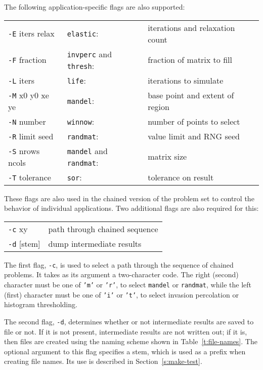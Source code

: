 The following application-specific flags are also supported:
\begin{small}\begin{center}\begin{tabular}{lll}
{\tt{-E}} iters relax	& {\tt{elastic}}:			& iterations and relaxation count\\
{\tt{-F}} fraction	& {\tt{invperc}} and {\tt{thresh}}:	& fraction of matrix to fill\\
{\tt{-L}} iters		& {\tt{life}}:				& iterations to simulate\\
{\tt{-M}} x0 y0 xe ye	& {\tt{mandel}}:			& base point and extent of region\\
{\tt{-N}} number	& {\tt{winnow}}:			& number of points to select\\
{\tt{-R}} limit seed	& {\tt{randmat}}:			& value limit and RNG seed\\
{\tt{-S}} nrows ncols	& {\tt{mandel}} and {\tt{randmat}}:	& matrix size\\
{\tt{-T}} tolerance	& {\tt{sor}}:				& tolerance on result\\
\end{tabular}\end{center}\end{small}
These flags are also used in the chained version of the problem set
to control the behavior of individual applications.
Two additional flags are also required for this:
\begin{small}\begin{center}\begin{tabular}{ll}
{\tt{-c}} xy		& path through chained sequence\\
{\tt{-d}} [stem]	& dump intermediate results
\end{tabular}\end{center}\end{small}
The first flag, {\tt{-c}},
is used to select a path through the sequence of chained problems.
It takes as its argument a two-character code.
The right (second) character must be one of {\tt{'m'}} or {\tt{'r'}},
to select {\tt{mandel}} or {\tt{randmat}},
while the left (first) character must be one of {\tt{'i'}} or {\tt{'t'}},
to select invasion percolation or histogram thresholding.

The second flag, {\tt{-d}},
determines whether or not intermediate results are saved to file or not.
If it is not present,
intermediate results are not written out;
if it is,
then files are created using the naming scheme shown in Table~\ref{t:file-names}.
The optional argument to this flag specifies a stem,
which is used as a prefix when creating file names.
Its use is described in Section~\ref{s:make-test}.

